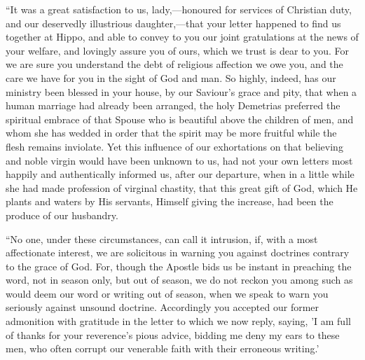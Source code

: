 ``It was a great satisfaction to us, lady,—honoured for
services of Christian duty, and our deservedly illustrious daughter,—that
your letter happened to find us together at Hippo, and able to convey
to you our joint gratulations at the news of your welfare, and
lovingly assure you of ours, which we trust is dear to you.
For we are sure you understand the debt of
religious affection we owe you, and the care we have for you in the
sight of God and man. So highly, indeed, has our ministry been blessed
in your house, by our Saviour's grace and pity, that when a human
marriage had already been arranged, the holy Demetrias preferred the
spiritual embrace of that Spouse who is beautiful above the children
of men, and whom she has wedded in order that the spirit may be more
fruitful while the flesh remains inviolate. Yet this influence of our
exhortations on that believing and noble virgin would have been
unknown to us, had not your own letters most happily and authentically
informed us, after our departure, when in a little while she had made
profession of virginal chastity, that this great gift of God, which He
plants and waters by His servants, Himself giving the increase, had
been the produce of our husbandry.

``No one, under these circumstances, can call it intrusion, if,
with a most affectionate interest, we are solicitous in warning you
against doctrines contrary to the grace of God. For, though the
Apostle bids us be instant in preaching the word, not in season only,
but out of season, we do not reckon you among such as would deem our
word or writing out of season, when we speak to warn you seriously
against unsound doctrine. Accordingly you accepted our former
admonition with gratitude in the letter to which we now reply, saying,
'I am full of thanks for your reverence's pious advice, bidding me
deny my ears to these men, who often corrupt our venerable faith with
their erroneous writing.'

